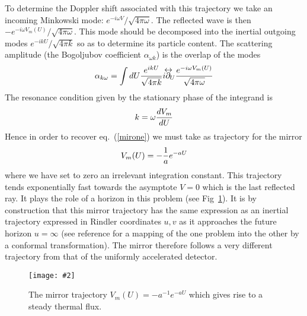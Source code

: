 \documentclass[12pt,oneside]{report}
\newcommand{\dessin}[4]
{\begin{figure}[tp]\begin{center}
\texttt{[image: \#2]}%
\end{center}
\caption{#4}
\label{#3}
\end{figure}}
\def\lrpartial{{\partial\kern-.75em\raise1.75ex
\hbox{$\leftrightarrow$}}\!\!}
\begin{document}
To determine the Doppler shift associated with this
trajectory we take an incoming Minkowski mode: $e^{- i
\omega V} /\sqrt{4 \pi \omega}$. The reflected wave is then
$-
e^{- i
\omega V_m(U)} /\sqrt{4 \pi \omega}$. This mode should be decomposed into the
inertial outgoing modes  $e^{- i
k U} /\sqrt{4 \pi k}$ so as to determine its particle content. The
scattering amplitude (the Bogoljubov coefficient $\alpha_{\omega k}$) 
is
the overlap of the modes
\begin{equation}
\alpha_{k \omega } = 
\int dU { e ^{i k U}\over \sqrt{4 \pi k}} i \lrpartial_U
{e^{- i \omega V_m(U)} \over\sqrt{4 \pi \omega}}
\label{mirfive}
\end{equation}
The resonance condition given by the stationary phase of
the integrand is
\begin{equation}
k=\omega {d V_m \over dU}
\label{mirsix}
\end{equation}
Hence in order to recover eq.~(\ref{mirone}) we must take as trajectory for the
mirror
  \begin{equation}
V_m(U)= -{1 \over a} e^{-a U}
\label{mirseven}
\end{equation}
where we have set to zero an irrelevant integration
constant.  This trajectory tends exponentially fast towards
the asymptote $V=0$ which is the last reflected ray. It plays the role of a horizon in
this problem (see Fig~\ref{ACCEL1}). It is by construction 
that this mirror trajectory has the same expression as an
inertial trajectory expressed in Rindler coordinates $u,v$ as it approaches the
future horizon $u=\infty$ (see reference \cite{BD} for a mapping 
of the one problem into the other by
a conformal transformation). The mirror therefore follows a very
different trajectory from that of the uniformly accelerated detector.

\dessin{1.000}{NFIG2-3.eps}{ACCEL1}{The mirror trajectory $V_m(U) = - a^{-1} e^{-aU}$ which
gives rise to a steady thermal flux.}
\end{document}
